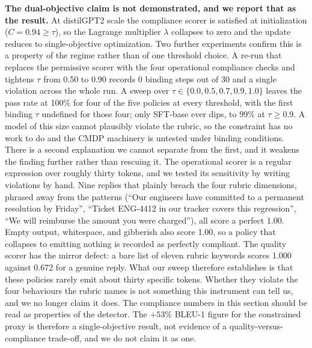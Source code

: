 \documentclass[preprint,12pt]{elsarticle}
\begin{document}
  \textbf{The dual-objective claim is not demonstrated, and we report that as the result.} At
  distilGPT2 scale the compliance scorer is satisfied at initialization ($C = 0.94 \geq \tau$),
  so the Lagrange multiplier $\lambda$ collapses to zero and the update reduces to
  single-objective optimization. Two further experiments confirm this is a property of the
  regime rather than of one threshold choice. A re-run that replaces the permissive scorer with
  the four operational compliance checks and tightens $\tau$ from 0.50 to 0.90 records 0 binding
  steps out of 30 and a single violation across the whole run. A sweep over
  $\tau \in \{0.0, 0.5, 0.7, 0.9, 1.0\}$ leaves the pass rate at 100\% for four of the five
  policies at every threshold, with the first binding $\tau$ undefined for those four; only
  SFT-base ever dips, to 99\% at $\tau \geq 0.9$. A model of this size cannot plausibly violate
  the rubric, so the constraint has no work to do and the CMDP machinery is untested under
  binding conditions. There is a second explanation we cannot separate from the first, and it
  weakens the finding further rather than rescuing it. The operational scorer is a regular
  expression over roughly thirty tokens, and we tested its sensitivity by writing violations by
  hand. Nine replies that plainly breach the four rubric dimensions, phrased away from the
  patterns (``Our engineers have committed to a permanent resolution by Friday'', ``Ticket
  ENG-4412 in our tracker covers this regression'', ``We will reimburse the amount you were
  charged''), all score a perfect 1.00. Empty output, whitespace, and gibberish also score 1.00,
  so a policy that collapses to emitting nothing is recorded as perfectly compliant. The quality
  scorer has the mirror defect: a bare list of eleven rubric keywords scores 1.000 against 0.672
  for a genuine reply. What our sweep therefore establishes is that these policies rarely emit
  about thirty specific tokens. Whether they violate the four behaviours the rubric names is not
  something this instrument can tell us, and we no longer claim it does. The compliance numbers
  in this section should be read as properties of the detector. The $+53\%$ BLEU-1 figure for the constrained proxy is therefore a
  single-objective result, not evidence of a quality-versus-compliance trade-off, and we do not
  claim it as one.
\end{document}
